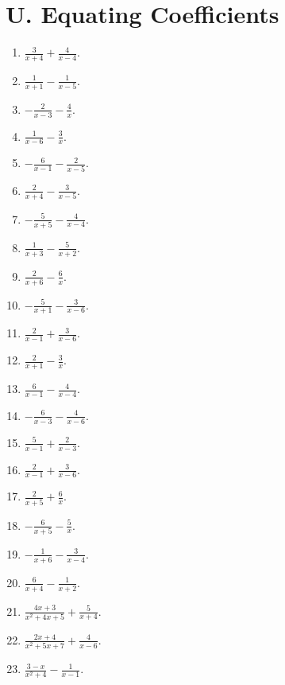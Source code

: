 \documentclass[11pt,oneside]{book}
\begin{document}
\section*{U. Equating Coefficients}
\begin{enumerate}[leftmargin=*,label=\textbf{U\arabic*.},itemsep=0.45\baselineskip]
\item $\displaystyle \frac{3}{x + 4} + \frac{4}{x - 4}$.
\item $\displaystyle \frac{1}{x + 1} - \frac{1}{x - 5}$.
\item $\displaystyle - \frac{2}{x - 3} - \frac{4}{x}$.
\item $\displaystyle \frac{1}{x - 6} - \frac{3}{x}$.
\item $\displaystyle - \frac{6}{x - 1} - \frac{2}{x - 5}$.
\item $\displaystyle \frac{2}{x + 4} - \frac{3}{x - 5}$.
\item $\displaystyle - \frac{5}{x + 5} - \frac{4}{x - 4}$.
\item $\displaystyle \frac{1}{x + 3} - \frac{5}{x + 2}$.
\item $\displaystyle \frac{2}{x + 6} - \frac{6}{x}$.
\item $\displaystyle - \frac{5}{x + 1} - \frac{3}{x - 6}$.
\item $\displaystyle \frac{2}{x - 1} + \frac{3}{x - 6}$.
\item $\displaystyle \frac{2}{x + 1} - \frac{3}{x}$.
\item $\displaystyle \frac{6}{x - 1} - \frac{4}{x - 4}$.
\item $\displaystyle - \frac{6}{x - 3} - \frac{4}{x - 6}$.
\item $\displaystyle \frac{5}{x - 1} + \frac{2}{x - 3}$.
\item $\displaystyle \frac{2}{x - 1} + \frac{3}{x - 6}$.
\item $\displaystyle \frac{2}{x + 5} + \frac{6}{x}$.
\item $\displaystyle - \frac{6}{x + 5} - \frac{5}{x}$.
\item $\displaystyle - \frac{1}{x + 6} - \frac{3}{x - 4}$.
\item $\displaystyle \frac{6}{x + 4} - \frac{1}{x + 2}$.
\item $\displaystyle \frac{4 x + 3}{x^{2} + 4 x + 5} + \frac{5}{x + 4}$.
\item $\displaystyle \frac{2 x + 4}{x^{2} + 5 x + 7} + \frac{4}{x - 6}$.
\item $\displaystyle \frac{3 - x}{x^{2} + 4} - \frac{1}{x - 1}$.

\end{enumerate}
\end{document}
